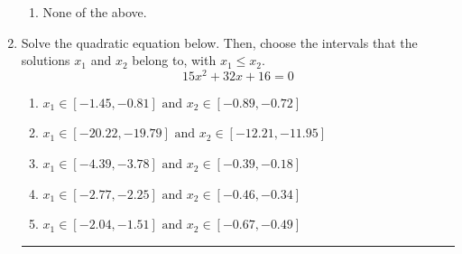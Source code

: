 \documentclass[14pt]{extbook}
\newcommand{\litem}[1]{\item#1\hspace*{-1cm}\rule{\textwidth}{0.4pt}}
\begin{document}
\begin{enumerate}
{\begin{enumerate}[label=\Alph*.]
\item None of the above.
\end{enumerate} }
\litem{
Solve the quadratic equation below. Then, choose the intervals that the solutions $x_1$ and $x_2$ belong to, with $x_1 \leq x_2$.\[ 15x^{2} +32 x + 16 = 0 \]\begin{enumerate}[label=\Alph*.]
\item \( x_1 \in [-1.45, -0.81] \text{ and } x_2 \in [-0.89, -0.72] \)
\item \( x_1 \in [-20.22, -19.79] \text{ and } x_2 \in [-12.21, -11.95] \)
\item \( x_1 \in [-4.39, -3.78] \text{ and } x_2 \in [-0.39, -0.18] \)
\item \( x_1 \in [-2.77, -2.25] \text{ and } x_2 \in [-0.46, -0.34] \)
\item \( x_1 \in [-2.04, -1.51] \text{ and } x_2 \in [-0.67, -0.49] \)


\end{enumerate}}
\end{enumerate}
\end{document}
